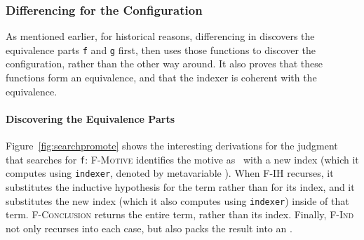 \subsubsection{Differencing for the Configuration}

As mentioned earlier, for historical reasons, differencing in \toolnamec discovers the equivalence parts \lstinline{f} and \lstinline{g} first, then uses
those functions to discover the configuration, rather than the other way around.
It also proves that these functions form an equivalence, and that the indexer is coherent with the equivalence.

\paragraph{Discovering the Equivalence Parts}
Figure~\ref{fig:searchpromote} shows the interesting derivations for the judgment 
that searches for \lstinline{f}:
\textsc{F-Motive} identifies the motive 
as \B\ with a new index (which it computes using \lstinline{indexer}, denoted by metavariable \smallmath{$\pi$}).
When \textsc{F-IH} recurses, it substitutes the inductive hypothesis for the term rather than
for its index, and it substitutes the new index (which it also computes using \lstinline{indexer}) inside of that term.
\textsc{F-Conclusion} returns the entire term, rather than its index.
Finally, \textsc{F-Ind} not only recurses into each case, but also packs the result into an .


